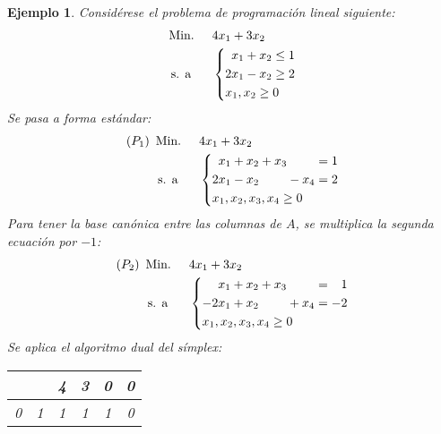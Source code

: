 \documentclass[11pt]{report}
\theoremstyle{mytheorem}
\theoremstyle{mydefinition}
\theoremstyle{myexample}
\newtheorem*{example}{Ejemplo}
\begin{document}
\begin{example}
Considérese el problema de programación lineal siguiente:
\[\begin{aligned}[t]
&\text{Min. } && 4x_1+3x_2 \\
& \, \text{s. a} &&\left\{\begin{alignedat}{10}
& &x_1 & {}+{} & x_2 & {}\leq{} & 1 \\
&2&x_1 & {}-{} & x_2 & {}\geq{} & 2  \\
&\mathrlap{x_1,x_2 \geq 0}
\end{alignedat}\right.
\end{aligned}\]
Se pasa a forma estándar:
\[\begin{aligned}[t]
(P_1)\ \, &\text{Min. } && 4x_1+3x_2 \\
& \, \text{s. a} &&\left\{\begin{alignedat}{10}
& &x_1 & {}+{} & x_2 & {}+{} & x_3 &       &     & {}={} & 1 \\
&2&x_1 & {}-{} & x_2 &       &     & {}-{} & x_4 & {}={} & 2 \\
&\mathrlap{x_1,x_2,x_3,x_4 \geq 0}
\end{alignedat}\right.
\end{aligned}\]
Para tener la base canónica entre las columnas de $A$, se multiplica la segunda ecuación por $-1$:
\[\begin{aligned}[t]
(P_2)\ \, &\text{Min. } && 4x_1+3x_2 \\
& \, \text{s. a} &&\left\{\begin{alignedat}{10}
&  & &x_1 & {}+{} & x_2 & {}+{} & x_3 &       &     & {}={} &  &1 \\
& -&2&x_1 & {}+{} & x_2 &       &     & {}+{} & x_4 & {}={} & -&2 \\
&\mathrlap{x_1,x_2,x_3,x_4 \geq 0}
\end{alignedat}\right.
\end{aligned}\]
Se aplica el algoritmo dual del símplex:
\begin{center}
\begin{tabular}{|c|c|c|c|c|c|}
    \cline{3-6}
    \multicolumn{1}{c}{} & \multicolumn{1}{c|}{} & \multicolumn{1}{c}{\phantom{-}4} & \multicolumn{1}{c}{\phantom{-}3} & \multicolumn{1}{c}{\phantom{-}0}  & \multicolumn{1}{c|}{\phantom{-}0} \\ \hline
    
    0 & \phantom{-}1 & \multicolumn{1}{c}{\phantom{-}1} & \multicolumn{1}{c}{\phantom{-}1} & \multicolumn{1}{c}{\phantom{-}1} & \multicolumn{1}{c|}{\phantom{-}0} \\
    

\end{tabular}
\end{center}
\end{example}
\end{document}
